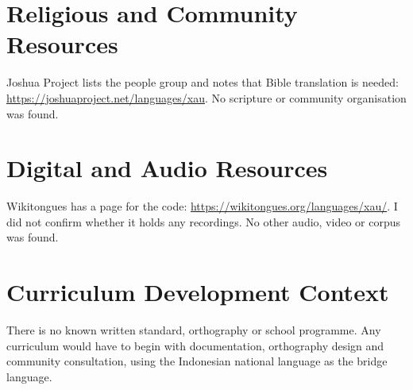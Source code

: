 \documentclass[12pt]{article}
\begin{document}
\section{Religious and Community Resources}
Joshua Project lists the people group and notes that Bible translation is needed: \url{https://joshuaproject.net/languages/xau}. No scripture or community organisation was found.

\section{Digital and Audio Resources}
Wikitongues has a page for the code: \url{https://wikitongues.org/languages/xau/}. I did not confirm whether it holds any recordings. No other audio, video or corpus was found.

\section{Curriculum Development Context}
There is no known written standard, orthography or school programme. Any curriculum would have to begin with documentation, orthography design and community consultation, using the Indonesian national language as the bridge language.
\end{document}
